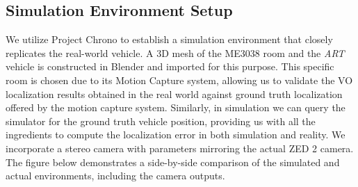 \documentclass{article}
\begin{document}
\subsection{Simulation Environment Setup}
We utilize Project Chrono to establish a simulation environment that closely replicates the real-world vehicle. A 3D mesh of the ME3038 room and the \textit{ART} vehicle is constructed in Blender and imported for this purpose. This specific room is chosen due to its Motion Capture system, allowing us to validate the VO localization results obtained in the real world against ground truth localization offered by the motion capture system. Similarly, in simulation we can query the simulator for the ground truth vehicle position, providing us with all the ingredients to compute the localization error in both simulation and reality. We incorporate a stereo camera with parameters mirroring the actual ZED 2 camera. The figure below demonstrates a side-by-side comparison of the simulated and actual environments, including the camera outputs.
\end{document}
